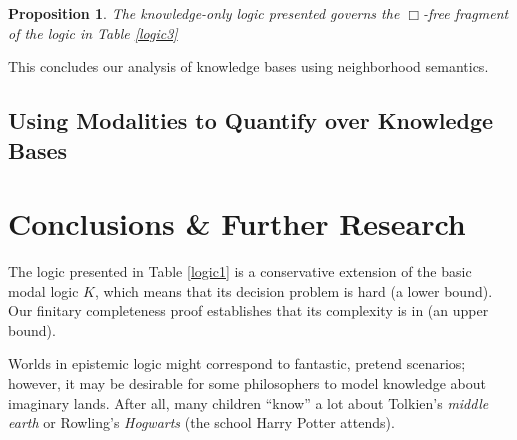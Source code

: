 \documentclass{article}
\newcommand{\tmem}[1]{{\em #1\/}}
\newcommand{\tmtextsf}[1]{{\sffamily{#1}}}
\newtheorem{proposition}{Proposition}
\begin{document}
\begin{proposition}
  The knowledge-only logic presented governs the $\Box$-free fragment of the
  logic in Table \ref{logic3}
\end{proposition}

This concludes our analysis of knowledge bases using neighborhood semantics.

\subsection{\label{quantifying}Using Modalities to Quantify over Knowledge
Bases}

\section{Conclusions \& Further Research}

The logic presented in Table \ref{logic1} is a conservative extension of the
basic modal logic $K$, which means that its decision problem is
\tmtextsf{PSPACE} hard (a lower bound).  Our finitary completeness proof
establishes that its complexity is in \tmtextsf{EXP2-TIME} (an upper bound).



Worlds in epistemic logic might correspond to fantastic, pretend scenarios;
however, it may be desirable for some philosophers to model knowledge about
imaginary lands.  After all, many children ``know'' a lot about Tolkien's
{\tmem{middle earth}} or Rowling's {\tmem{Hogwarts}} (the school Harry Potter
attends).



\end{document}
